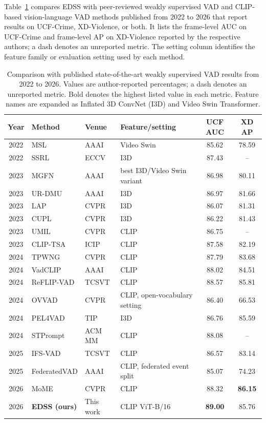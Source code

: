 \documentclass[preprint,12pt]{elsarticle}
\newcommand{\ours}{EDSS}
\begin{document}
Table~\ref{tab:sota} compares EDSS with peer-reviewed weakly supervised VAD and CLIP-based vision-language VAD methods published from 2022 to 2026 that report results on UCF-Crime, XD-Violence, or both. It lists the frame-level AUC on UCF-Crime and frame-level AP on XD-Violence reported by the respective authors; a dash denotes an unreported metric. The setting column identifies the feature family or evaluation setting used by each method.

\begin{table}[t]
\centering
\caption{Comparison with published state-of-the-art weakly supervised VAD results from 2022 to 2026. Values are author-reported percentages; a dash denotes an unreported metric. Bold denotes the highest listed value in each metric. Feature names are expanded as Inflated 3D ConvNet (I3D) and Video Swin Transformer.}
\label{tab:sota}
\footnotesize
\setlength{\tabcolsep}{3pt}
\renewcommand{\arraystretch}{0.97}
\begin{tabularx}{\textwidth}{@{}cXlXcc@{}}
\toprule
Year & Method & Venue & Feature/setting & UCF AUC & XD AP \\
\midrule
2022 & MSL \citep{msl2022} & AAAI & Video Swin & 85.62 & 78.59 \\
2022 & SSRL \citep{ssrl2022} & ECCV & I3D & 87.43 & -- \\
\midrule
2023 & MGFN \citep{mgfn2023} & AAAI & best I3D/Video Swin variant & 86.98 & 80.11 \\
2023 & UR-DMU \citep{urdmu2023} & AAAI & I3D & 86.97 & 81.66 \\
2023 & LAP \citep{lap2023} & CVPR & I3D & 86.07 & 81.31 \\
2023 & CUPL \citep{cupl2023} & CVPR & I3D & 86.22 & 81.43 \\
2023 & UMIL \citep{umil2023} & CVPR & CLIP & 86.75 & -- \\
2023 & CLIP-TSA \citep{cliptsa2023} & ICIP & CLIP & 87.58 & 82.19 \\
\midrule
2024 & TPWNG \citep{tpwng2024} & CVPR & CLIP & 87.79 & 83.68 \\
2024 & VadCLIP \citep{vadclip2024} & AAAI & CLIP & 88.02 & 84.51 \\
2024 & ReFLIP-VAD \citep{reflip2024} & TCSVT & CLIP & 88.57 & 85.81 \\
2024 & OVVAD \citep{ovvad2024} & CVPR & CLIP, open-vocabulary setting & 86.40 & 66.53 \\
2024 & PEL4VAD \citep{pel4vad2024} & TIP & I3D & 86.76 & 85.59 \\
2024 & STPrompt \citep{stprompt2024} & ACM MM & CLIP & 88.08 & -- \\
\midrule
2025 & IFS-VAD \citep{ifsvad2025} & TCSVT & CLIP & 86.57 & 83.14 \\
2025 & FederatedVAD \citep{federatedvad2025} & AAAI & CLIP, federated event split & 85.07 & 74.23 \\
\midrule
2026 & MoME \citep{mome2026} & CVPR & CLIP & 88.32 & \textbf{86.15} \\
2026 & \textbf{\ours{} (ours)} & This work & CLIP ViT-B/16 & \textbf{89.00} & 85.76 \\
\bottomrule
\end{tabularx}
\end{table}
\end{document}
